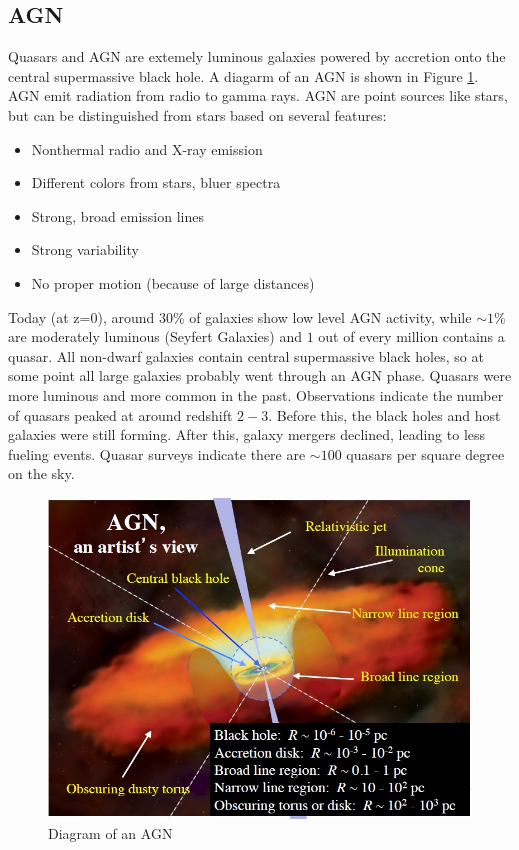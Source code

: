 \subsection{AGN}
Quasars and AGN are extemely luminous galaxies powered 
by accretion onto the central supermassive black hole.  A diagarm of an AGN is 
shown in Figure \ref{fig:AGN}.  AGN emit radiation from radio to gamma rays.  
AGN are point sources like stars, but can be distinguished from stars based on 
several features:
\begin{itemize}
\item Nonthermal radio and X-ray emission
\item Different colors from stars, bluer spectra
\item Strong, broad emission lines
\item Strong variability 
\item No proper motion (because of large distances)
\end{itemize}
Today (at z=$0$), around $30$\% of galaxies show low level AGN activity, 
while $\sim1$\% are moderately luminous (Seyfert Galaxies) and $1$ out of 
every million contains a quasar.  All non-dwarf galaxies contain central 
supermassive black holes, so at some point all large galaxies probably went 
through an AGN phase.  Quasars were more luminous and more common in the past.  
Observations indicate the number of quasars peaked at around redshift $2-3$.  
Before this, the black holes and host galaxies were still forming.  After this, 
galaxy mergers declined, leading to less fueling events.  Quasar surveys 
indicate there are $\sim100$ quasars per square degree on the sky.  

\begin{figure}[!h]
\begin{center}
\includegraphics[width=\textwidth]{AGN.jpg}
\end{center}
\caption{Diagram of an AGN  
\label{fig:AGN}}
\end{figure}

